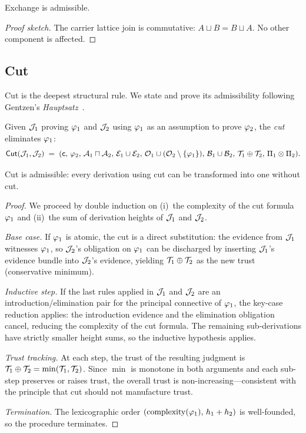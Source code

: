 \documentclass[11pt]{article}
\begin{document}
\begin{theorem}\label{thm:exch}
Exchange is admissible.
\end{theorem}

\begin{proof}[Proof sketch]
The carrier lattice join is commutative: $A \sqcup B = B \sqcup A$.
No other component is affected.
\end{proof}

\subsection{Cut}\label{ssec:cut}

Cut is the deepest structural rule.  We state and prove its admissibility
following Gentzen's \emph{Hauptsatz}~\cite{gentzen35}.

\begin{definition}[Cut]
Given $\mathcal{J}_1$ proving $\varphi_1$ and $\mathcal{J}_2$ using $\varphi_1$ as an assumption
to prove $\varphi_2$, the \emph{cut} eliminates $\varphi_1$:
\[
  \mathsf{Cut}(\mathcal{J}_1, \mathcal{J}_2) \;=\;
  (\mathsf{c},\,\varphi_2,\,\mathcal{A}_1 \sqcap \mathcal{A}_2,\,\mathcal{E}_1 \cup \mathcal{E}_2,\,\mathcal{O}_1 \cup (\mathcal{O}_2 \setminus \{\varphi_1\}),\,\mathcal{B}_1 \cup \mathcal{B}_2,\,\mathcal{T}_1 \oplus \mathcal{T}_2,\,\Pi_1 \otimes \Pi_2).
\]
\end{definition}

\begin{theorem}\label{thm:cut}
Cut is admissible: every derivation using cut can be transformed into one
without cut.
\end{theorem}

\begin{proof}
We proceed by double induction on (i)~the complexity of the cut formula
$\varphi_1$ and (ii)~the sum of derivation heights of $\mathcal{J}_1$ and $\mathcal{J}_2$.

\emph{Base case.}  If $\varphi_1$ is atomic, the cut is a direct substitution:
the evidence from $\mathcal{J}_1$ witnesses $\varphi_1$, so $\mathcal{J}_2$'s obligation on
$\varphi_1$ can be discharged by inserting $\mathcal{J}_1$'s evidence bundle into
$\mathcal{J}_2$'s evidence, yielding $\mathcal{T}_1 \oplus \mathcal{T}_2$ as the new trust
(conservative minimum).

\emph{Inductive step.}  If the last rules applied in $\mathcal{J}_1$ and $\mathcal{J}_2$
are an introduction/elimination pair for the principal connective of $\varphi_1$,
the key-case reduction applies: the introduction evidence and the elimination
obligation cancel, reducing the complexity of the cut formula.  The remaining
sub-derivations have strictly smaller height sums, so the inductive hypothesis
applies.

\emph{Trust tracking.}  At each step, the trust of the resulting judgment is
$\mathcal{T}_1 \oplus \mathcal{T}_2 = \min(\mathcal{T}_1, \mathcal{T}_2)$.  Since
$\min$ is monotone in both arguments and each sub-step preserves or raises
trust, the overall trust is non-increasing---consistent with the principle
that cut should not manufacture trust.

\emph{Termination.}  The lexicographic order
$(\mathrm{complexity}(\varphi_1),\, h_1 + h_2)$ is well-founded, so the
procedure terminates.
\end{proof}
\end{document}
